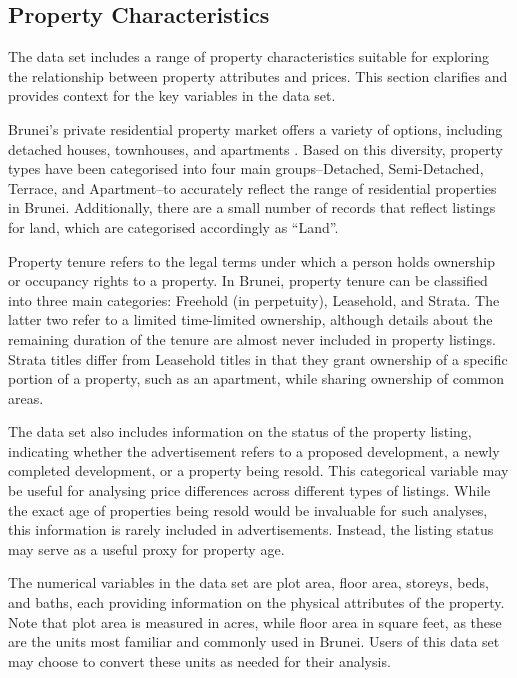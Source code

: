 \documentclass[
  number]{elsarticle}
\begin{document}
\subsection{Property Characteristics}\label{property-characteristics}

The data set includes a range of property characteristics suitable for
exploring the relationship between property attributes and prices. This
section clarifies and provides context for the key variables in the data
set.

Brunei's private residential property market offers a variety of
options, including detached houses, townhouses, and apartments
\citep{hassan2023sociocultural}. Based on this diversity, property types
have been categorised into four main groups--Detached, Semi-Detached,
Terrace, and Apartment--to accurately reflect the range of residential
properties in Brunei. Additionally, there are a small number of records
that reflect listings for land, which are categorised accordingly as
``Land''.

Property tenure refers to the legal terms under which a person holds
ownership or occupancy rights to a property. In Brunei, property tenure
can be classified into three main categories: Freehold (in perpetuity),
Leasehold, and Strata. The latter two refer to a limited time-limited
ownership, although details about the remaining duration of the tenure
are almost never included in property listings. Strata titles differ
from Leasehold titles in that they grant ownership of a specific portion
of a property, such as an apartment, while sharing ownership of common
areas.

The data set also includes information on the status of the property
listing, indicating whether the advertisement refers to a proposed
development, a newly completed development, or a property being resold.
This categorical variable may be useful for analysing price differences
across different types of listings. While the exact age of properties
being resold would be invaluable for such analyses, this information is
rarely included in advertisements. Instead, the listing status may serve
as a useful proxy for property age.

The numerical variables in the data set are plot area, floor area,
storeys, beds, and baths, each providing information on the physical
attributes of the property. Note that plot area is measured in acres,
while floor area in square feet, as these are the units most familiar
and commonly used in Brunei. Users of this data set may choose to
convert these units as needed for their analysis.
\end{document}
